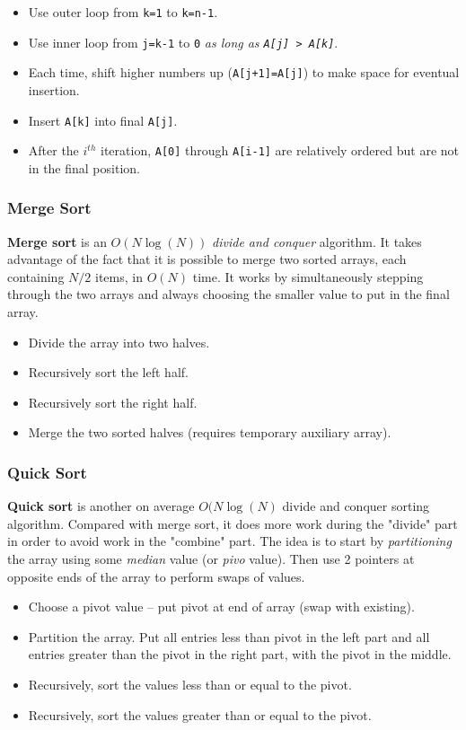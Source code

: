 \begin{itemize}
	\item Use outer loop from \texttt{k=1} to \texttt{k=n-1}.
	\item Use inner loop from \texttt{j=k-1} to \texttt{0} \textit{as long as \texttt{A[j] > A[k]}}. 
	\item Each time, shift higher numbers up (\texttt{A[j+1]=A[j]}) to make space for eventual insertion. 
	\item Insert \texttt{A[k]} into final \texttt{A[j]}. 
	\item After the $i^{th}$ iteration, \texttt{A[0]} through \texttt{A[i-1]} are relatively ordered but are not in the final position. 
\end{itemize}

\subsubsection{Merge Sort}

\textbf{Merge sort} is an $O(N \log(N))$ \textit{divide and conquer} algorithm. It takes advantage of the fact that it is possible to merge two sorted arrays, each containing $N/2$ items, in $O(N)$ time. It works by simultaneously stepping through the two arrays and always choosing the smaller value to put in the final array. 

\begin{itemize}
	\item Divide the array into two halves.
	\item Recursively sort the left half. 
	\item Recursively sort the right half. 
	\item Merge the two sorted halves (requires temporary auxiliary array). 
\end{itemize}

\subsubsection{Quick Sort}

\textbf{Quick sort} is another on average $O(N \log(N)$ divide and conquer sorting algorithm. Compared with merge sort, it does more work during the "divide" part in order to avoid work in the "combine" part. The idea is to start by \textit{partitioning} the array using some \textit{median} value (or \textit{pivo} value). Then use 2 pointers at opposite ends of the array to perform swaps of values. 

\begin{itemize}
	\item Choose a pivot value -- put pivot at end of array (swap with existing).
	\item Partition the array. Put all entries less than pivot in the left part and all entries greater than the pivot in the right part, with the pivot in the middle. 
	\item Recursively, sort the values less than or equal to the pivot. 
	\item Recursively, sort the values greater than or equal to the pivot. 
\end{itemize}

